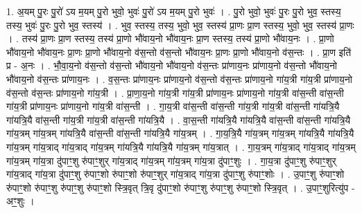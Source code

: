 \documentclass[17pt]{extarticle}
\begin{document}
1. अ॒यम् पु॒रः पु॒रो॑ ऽय म॒यम् पु॒रो भुवो॒ भुवः॑ पु॒रो॑ ऽय म॒यम् पु॒रो भुवः॑ । . पु॒रो भुवो॒ भुवः॑ पु॒रः पु॒रो भुव॒ स्तस्य॒ तस्य॒ भुवः॑ पु॒रः पु॒रो भुव॒ स्तस्य॑ । . भुव॒ स्तस्य॒ तस्य॒ भुवो॒ भुव॒ स्तस्य॑ प्रा॒णः प्रा॒ण स्तस्य॒ भुवो॒ भुव॒ स्तस्य॑ प्रा॒णः । . तस्य॑ प्रा॒णः प्रा॒ण स्तस्य॒ तस्य॑ प्रा॒णो भौ॑वाय॒नो भौ॑वाय॒नः प्रा॒ण स्तस्य॒ तस्य॑ प्रा॒णो भौ॑वाय॒नः । . प्रा॒णो भौ॑वाय॒नो भौ॑वाय॒नः प्रा॒णः प्रा॒णो भौ॑वाय॒नो व॑स॒न्तो व॑स॒न्तो भौ॑वाय॒नः प्रा॒णः प्रा॒णो भौ॑वाय॒नो व॑स॒न्तः । . प्रा॒ण इति॑ प्र - अ॒नः । . भौ॒वा॒य॒नो व॑स॒न्तो व॑स॒न्तो भौ॑वाय॒नो भौ॑वाय॒नो व॑स॒न्तः प्रा॑णाय॒नः प्रा॑णाय॒नो व॑स॒न्तो भौ॑वाय॒नो भौ॑वाय॒नो व॑स॒न्तः प्रा॑णाय॒नः । . व॒स॒न्तः प्रा॑णाय॒नः प्रा॑णाय॒नो व॑स॒न्तो व॑स॒न्तः प्रा॑णाय॒नो गा॑य॒त्री गा॑य॒त्री प्रा॑णाय॒नो व॑स॒न्तो व॑स॒न्तः प्रा॑णाय॒नो गा॑य॒त्री । . प्रा॒णा॒य॒नो गा॑य॒त्री गा॑य॒त्री प्रा॑णाय॒नः प्रा॑णाय॒नो गा॑य॒त्री वा॑स॒न्ती वा॑स॒न्ती गा॑य॒त्री प्रा॑णाय॒नः प्रा॑णाय॒नो गा॑य॒त्री वा॑स॒न्ती । . गा॒य॒त्री वा॑स॒न्ती वा॑स॒न्ती गा॑य॒त्री गा॑य॒त्री वा॑स॒न्ती गा॑यत्रि॒यै गा॑यत्रि॒यै वा॑स॒न्ती गा॑य॒त्री गा॑य॒त्री वा॑स॒न्ती गा॑यत्रि॒यै । . वा॒स॒न्ती गा॑यत्रि॒यै गा॑यत्रि॒यै वा॑स॒न्ती वा॑स॒न्ती गा॑यत्रि॒यै गा॑य॒त्रम् गा॑य॒त्रम् गा॑यत्रि॒यै वा॑स॒न्ती वा॑स॒न्ती गा॑यत्रि॒यै गा॑य॒त्रम् । . गा॒य॒त्रि॒यै गा॑य॒त्रम् गा॑य॒त्रम् गा॑यत्रि॒यै गा॑यत्रि॒यै गा॑य॒त्रम् गा॑य॒त्राद् गा॑य॒त्राद् गा॑य॒त्रम् गा॑यत्रि॒यै गा॑यत्रि॒यै गा॑य॒त्रम् गा॑य॒त्रात् । . गा॒य॒त्रम् गा॑य॒त्राद् गा॑य॒त्राद् गा॑य॒त्रम् गा॑य॒त्रम् गा॑य॒त्रा दु॑पाꣳ॒॒शु रु॑पाꣳ॒॒शुर् गा॑य॒त्राद् गा॑य॒त्रम् गा॑य॒त्रम् गा॑य॒त्रा दु॑पाꣳ॒॒शुः । . गा॒य॒त्रा दु॑पाꣳ॒॒शु रु॑पाꣳ॒॒शुर् गा॑य॒त्राद् गा॑य॒त्रा दु॑पाꣳ॒॒शु रु॑पाꣳ॒॒शो रु॑पाꣳ॒॒शो रु॑पाꣳ॒॒शुर् गा॑य॒त्राद् गा॑य॒त्रा दु॑पाꣳ॒॒शु रु॑पाꣳ॒॒शोः । . उ॒पाꣳ॒॒शु रु॑पाꣳ॒॒शो रु॑पाꣳ॒॒शो रु॑पाꣳ॒॒शु रु॑पाꣳ॒॒शु रु॑पाꣳ॒॒शो स्त्रि॒वृत् त्रि॒वृ 
दु॑पाꣳ॒॒शो रु॑पाꣳ॒॒शु रु॑पाꣳ॒॒शु रु॑पाꣳ॒॒शो स्त्रि॒वृत् । . उ॒पाꣳ॒॒शुरित्यु॑प - अꣳ॒॒शुः । \newline
\end{document}

